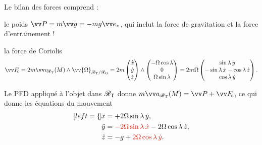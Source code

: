 \documentclass[12pt,fancy]{cours}
\begin{document}
  Le bilan des forces comprend :
  \begin{liste}
    \item le poids $\Vec{P} = m \Vec{g} = - m g \ez$, qui inclut la force de gravitation et la force d'entrainement !
    \item la force de Coriolis
    \begin{equation}
    \Fc = 2m\vRef{\RT}(M)\pv\vv{\Omega}_{\RT/\RG} =  2m \begin{pmatrix}
      \dot{x} \\
      \dot{y} \\
      \dot{z}
    \end{pmatrix}\pv \begin{pmatrix}
      -\Omega\cos\lambda \\
      0 \\
      \Omega\sin\lambda
    \end{pmatrix} = 2m\Omega\begin{pmatrix}
      \sin\lambda \, \dot{y} \\
      -\sin\lambda \, \dot{x} -\cos\lambda \, \dot{z} \\
      \cos\lambda \, \dot{y}
    \end{pmatrix}.
    \end{equation}
  \end{liste}  
 Le PFD appliqué à l'objet dans $\mathcal{R}_{\rm T}$ donne $m\aRef{\RT}(M)= \Vec{P} + \Fc$, ce qui donne les équations du mouvement
\begin{subequations}
  \label{eq:système_exact_déviation_est}
    \begin{align}[left=\empheqlbrace]
    \ddot{x}&=+2\Omega\sin\lambda\,\dot{y},\label{eq:x}\\
    \ddot{y}&=\JRouge{-2\Omega\sin\lambda\,\dot{x}}-2 \Omega\cos\lambda\,\dot{z},\label{eq:y}\\
    \ddot{z}&=-g+\JRouge{2\Omega\cos\lambda\,\dot{y}}.\label{eq:z}
  \end{align}
\end{subequations}
\end{document}
